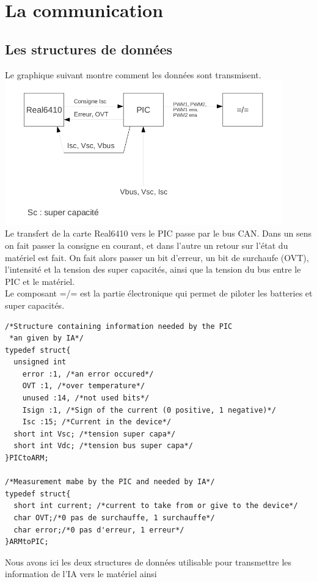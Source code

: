 \documentclass[a4,french,12pt]{article}
\begin{document}
\newpage
\section{La communication}

\subsection{Les structures de données}
Le graphique suivant montre comment les données sont transmisent.\\
\includegraphics[width=0.9\textwidth]{images/transfert_donnees.png} \\
Le transfert de la carte Real6410 vers le PIC passe par le bus CAN. Dans un sens on fait passer la consigne en courant, 
et dans l'autre un retour sur l'état du matériel est fait. On fait alors passer un bit d'erreur, un bit de surchaufe (OVT), 
l'intensité et la tension des super capacités, ainsi que la tension du bus entre le PIC et le matériel. \\
Le composant =/= est la partie électronique qui permet de piloter les batteries et super capacités. \\
\begin{verbatim}
/*Structure containing information needed by the PIC
 *an given by IA*/
typedef struct{
  unsigned int
    error :1, /*an error occured*/
    OVT :1, /*over temperature*/
    unused :14, /*not used bits*/
    Isign :1, /*Sign of the current (0 positive, 1 negative)*/
    Isc :15; /*Current in the device*/
  short int Vsc; /*tension super capa*/
  short int Vdc; /*tension bus super capa*/
}PICtoARM;

/*Measurement mabe by the PIC and needed by IA*/
typedef struct{
  short int current; /*current to take from or give to the device*/
  char OVT;/*0 pas de surchauffe, 1 surchauffe*/
  char error;/*0 pas d'erreur, 1 erreur*/
}ARMtoPIC;
\end{verbatim}
Nous avons ici les deux structures de données utilisable pour transmettre les information de l'IA vers le matériel ainsi 
\end{document}
